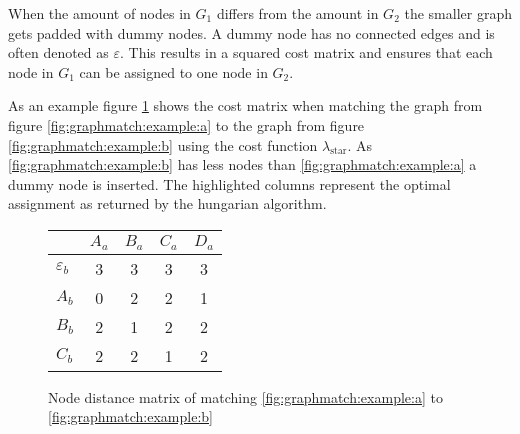 \documentclass[
    12pt,                               %
    DIV=14,                     %
    parskip=half+,              %
    bigheadings,                %
    cleardoubleempty,   %
    halfparskip,                %
    ]{scrreprt} %
\begin{document}
When the amount of nodes in $G_1$ differs from the amount in $G_2$ the smaller graph gets padded with dummy nodes. A dummy node has no connected edges and is often denoted as $\varepsilon$. This results in a squared cost matrix and ensures that each node in $G_1$ can be assigned to one node in $G_2$.

As an example figure \ref{fig:graphmatch:distance} shows the cost matrix when matching the graph from figure \ref{fig:graphmatch:example:a} to the graph from figure \ref{fig:graphmatch:example:b} using the cost function $\lambda_{\text{star}}$. As \ref{fig:graphmatch:example:b} has less nodes than \ref{fig:graphmatch:example:a} a dummy node is inserted. The highlighted columns represent the optimal assignment as returned by the hungarian algorithm.

\begin{figure}[H]
	\centering
	\begin{tabular}{| l | c | c | c | c |}
		\hline
						& $A_a$ & $B_a$ & $C_a$ & $D_a$ \\
		\hline
		$\varepsilon_b$	& 3 & 3 & 3 & \cellcolor{orange}3 \\
		\hline
		$A_b$			& \cellcolor{orange}0 & 2 & 2 & 1 \\
		\hline
		$B_b$			& 2 & \cellcolor{orange}1 & 2 & 2 \\
		\hline
		$C_b$			& 2 & 2 & \cellcolor{orange}1 & 2 \\
		\hline
	\end{tabular}
	\caption{Node distance matrix of matching \ref{fig:graphmatch:example:a} to \ref{fig:graphmatch:example:b}}
	\label{fig:graphmatch:distance}
\end{figure}

\end{document}

